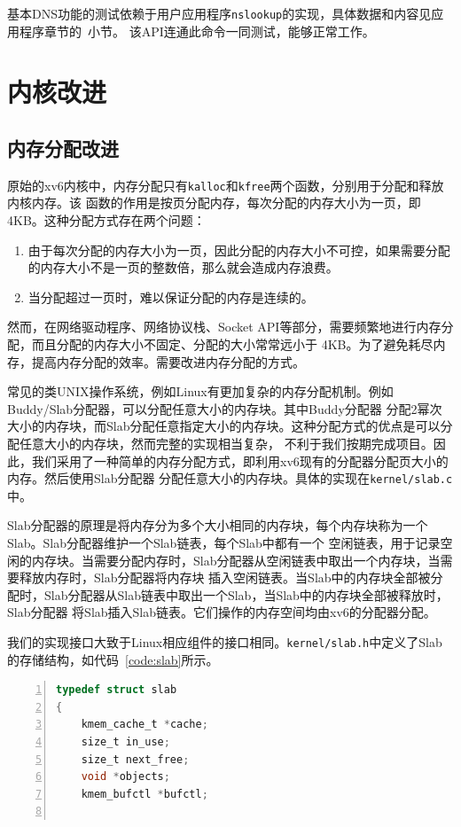 \documentclass[a4paper,twoside]{ctexrep}
\begin{document}
\begin{spacing}{1.2}
基本DNS功能的测试依赖于用户应用程序\texttt{nslookup}的实现，具体数据和内容见应用程序章节的~小节。
该API连通此命令一同测试，能够正常工作。

\section{内核改进}
\label{sec:kernel}

\subsection{内存分配改进}

原始的xv6内核中，内存分配只有\texttt{kalloc}和\texttt{kfree}两个函数，分别用于分配和释放内核内存。该
函数的作用是按页分配内存，每次分配的内存大小为一页，即4KB。这种分配方式存在两个问题：
\begin{enumerate}
	\item 由于每次分配的内存大小为一页，因此分配的内存大小不可控，如果需要分配的内存大小不是一页的整数倍，那么就会造成内存浪费。
	\item 当分配超过一页时，难以保证分配的内存是连续的。
\end{enumerate}
然而，在网络驱动程序、网络协议栈、Socket API等部分，需要频繁地进行内存分配，而且分配的内存大小不固定、分配的大小常常远小于
4KB。为了避免耗尽内存，提高内存分配的效率。需要改进内存分配的方式。

常见的类UNIX操作系统，例如Linux有更加复杂的内存分配机制。例如Buddy\cite{peterson1977buddy}/Slab\cite{bonwick1994slab}分配器，可以分配任意大小的内存块。其中Buddy分配器
分配2幂次大小的内存块，而Slab分配任意指定大小的内存块。这种分配方式的优点是可以分配任意大小的内存块，然而完整的实现相当复杂，
不利于我们按期完成项目。因此，我们采用了一种简单的内存分配方式，即利用xv6现有的分配器分配页大小的内存。然后使用Slab分配器
分配任意大小的内存块。具体的实现在\texttt{kernel/slab.c}中。

Slab分配器的原理是将内存分为多个大小相同的内存块，每个内存块称为一个Slab。Slab分配器维护一个Slab链表，每个Slab中都有一个
空闲链表，用于记录空闲的内存块。当需要分配内存时，Slab分配器从空闲链表中取出一个内存块，当需要释放内存时，Slab分配器将内存块
插入空闲链表。当Slab中的内存块全部被分配时，Slab分配器从Slab链表中取出一个Slab，当Slab中的内存块全部被释放时，Slab分配器
将Slab插入Slab链表。它们操作的内存空间均由xv6的分配器分配。

我们的实现接口大致于Linux相应组件的接口相同。\texttt{kernel/slab.h}中定义了Slab的存储结构，如代码~\ref{code:slab}所示。
\begin{lstlisting}[numbers=left,style=CppStyle,caption={Slab的存储结构},label={code:slab},language=C]
typedef struct slab
{
	kmem_cache_t *cache;
	size_t in_use;
	size_t next_free;
	void *objects;
	kmem_bufctl *bufctl;


\end{lstlisting}
\end{spacing}
\end{document}
